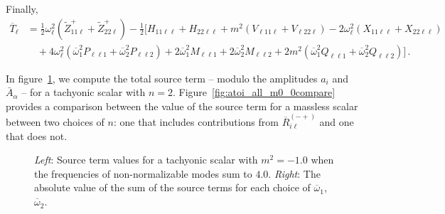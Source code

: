 \documentclass[letterpaper,11pt]{article}
\newcommand{\ol}{\omega_\ell}
\newcommand{\oone}{\overline{\omega}_1}
\newcommand{\otwo}{\overline{\omega}_2}
\begin{document}
Finally, 
\begin{align}
\label{T12}
\overline{T}_{\ell} &=  \frac{1}{2} \ol^2 \left( \tilde{Z}^+_{11\ell} + \tilde{Z}^+_{22\ell} \right)- \frac{1}{2} \Big[ H_{11\ell\ell} + H_{22\ell\ell} + m^2 \left( V_{\ell 1 1 \ell} + V_{\ell 2 2 \ell} \right) - 2 \ol^2 \left( X_{11\ell\ell} + X_{22\ell\ell} \right)  \nonumber \\
%
& \quad + 4 \ol^2 \left( \oone^2 P_{\ell \ell 1} + \otwo^2 P_{\ell \ell 2} \right) + 2\oone^2 M_{\ell \ell 1} + 2\otwo^2 M_{\ell \ell 2} + 2m^2 \left( \oone^2 Q_{\ell\ell 1} + \otwo^2 Q_{\ell \ell 2} \right) \Big] \, .
\end{align}

In figure~\ref{fig:atoi_all_m-4_0}, we compute the total source term -- modulo the amplitudes $a_i$ and $\bar A_\alpha$ -- for a tachyonic scalar with $n = 2$. Figure~\ref{fig:atoi_all_m0_0compare} provides a comparison between the value of the source term for a massless scalar between two choices of $n$: one that includes contributions from $\overline{R}_{i\ell}^{(-+)}$ and one that does not.

\begin{figure}
\centering
\caption{{\it Left}: Source term values for a tachyonic scalar with $m^2 = -1.0$ when the frequencies of non-normalizable modes sum to $4.0$. {\it Right}: The absolute value of the sum of the source terms for each choice of $\oone$, $\otwo$.}
\label{fig:atoi_all_m-4_0}
\end{figure}
\end{document}
